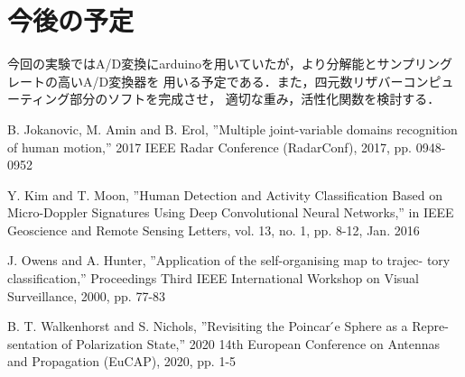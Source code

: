 \documentclass[uplatex,a4paper,10pt]{jsarticle}
\begin{document}
\section{今後の予定}
今回の実験ではA/D変換にarduinoを用いていたが，より分解能とサンプリングレートの高いA/D変換器を
用いる予定である．また，四元数リザバーコンピューティング部分のソフトを完成させ，
適切な重み，活性化関数を検討する．

\newpage 
\begin{thebibliography}{99}
		
	 B. Jokanovic, M. Amin and B. Erol, ”Multiple joint-variable domains recognition of human motion,” 2017 IEEE Radar Conference (RadarConf), 2017, pp. 0948- 0952
	
     Y. Kim and T. Moon, ”Human Detection and Activity Classification Based on Micro-Doppler Signatures Using Deep Convolutional Neural Networks,” in IEEE Geoscience and Remote Sensing Letters, vol. 13, no. 1, pp. 8-12, Jan. 2016
	
     J. Owens and A. Hunter, ”Application of the self-organising map to trajec- tory classification,” Proceedings Third IEEE International Workshop on Visual Surveillance, 2000, pp. 77-83

     B. T. Walkenhorst and S. Nichols, ”Revisiting the Poincar ́e Sphere as a Repre- sentation of Polarization State,” 2020 14th European Conference on Antennas and Propagation (EuCAP), 2020, pp. 1-5
	
	
	    

\end{thebibliography}
\end{document}
